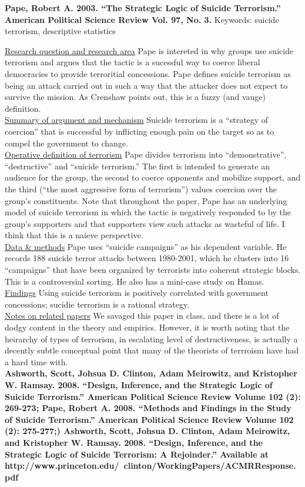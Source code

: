 \documentclass{article}[12pt]
\begin{document}
\textbf{Pape, Robert A. 2003. “The Strategic Logic of Suicide Terrorism.” American Political Science Review Vol. 97, No. 3.}
Keywords: suicide terrorism, descriptive statistics

\underline{Research question and research area} Pape is intereted in why groups use suicide terrorism and argues that the tactic is a sucessful way to coerce liberal democracies to provide terroritial concessions. Pape defines suicide terrorism as being an attack carried out in such a way that the attacker does not expect to survive the mission.  As Crenshaw points out, this is a fuzzy (and vauge) definition.\\
\underline{Summary of argument and mechanism} Suicide terrorism is a ``strategy of coercion'' that is successful by inflicting enough pain on the target so as to compel the government to change.\\
\underline{Operative definition of terrorism} Pape divides terrorism into ``demonstrative'', ``destructive'' and ``suicide terrorism.'' The first is intended to generate an audience for the group, the second to coerce opponents and mobilize support, and the third (``the most aggressive form of terrorism'') values coercion over the group's constituents. Note that throughout the paper, Pape has an underlying model of suicide terrorism in which the tactic is negatively responded to by the group's supporters and that supporters view such attacks as wasteful of life. I think that this is a naieve perspective. \\
\underline{Data \& methods} Pape uses ``suicide campaigns'' as his dependent variable. He records 188 suicide terror attacks between 1980-2001, which he clusters into 16 ``campaigns'' that have been organized by terrorists into coherent strategic blocks. This is a controversial sorting. He also has a mini-case study on Hamas.\\
\underline{Findings} Using suicide terrorism is positively correlated with government concessions; sucidie terrorism is a rational strategy.\\
\underline{Notes on related papers} We savaged this paper in class, and there is a lot of dodgy content in the theory and empirics. However, it is worth noting that the heirarchy of types of terrorism, in escalating level of destructiveness, is actually a decently subtle conceptual point that many of the theorists of terrroism have had a hard time with.\\


\textbf{Ashworth, Scott, Johsua D. Clinton, Adam Meirowitz, and Kristopher W. Ramsay. 2008. “Design, Inference, and the Strategic Logic of Suicide Terrorism.” American Political Science Review Volume 102 (2): 269-273;  Pape, Robert A. 2008. “Methods and Findings in the Study of Suicide Terrorism.” American Political Science Review Volume 102 (2): 275-277;) Ashworth, Scott, Johsua D. Clinton, Adam Meirowitz, and Kristopher W. Ramsay. 2008. “Design, Inference, and the Strategic Logic of Suicide Terrorism: A Rejoinder.” Available at http://www.princeton.edu/~clinton/WorkingPapers/ACMRResponse.pdf}
\end{document}
